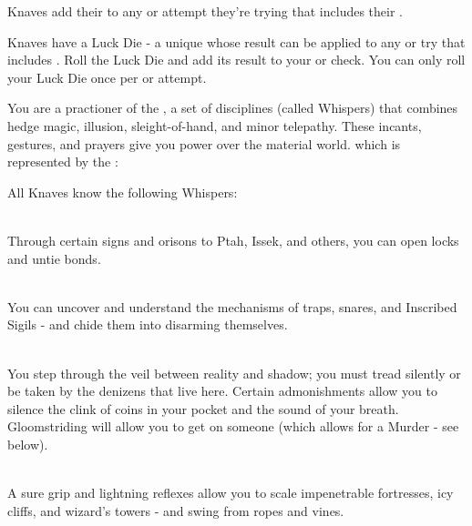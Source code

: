 {  
  Knaves add their \LVL to any \RO or \RB attempt they're trying that includes their \DEX.  

  Knaves have a Luck Die - a unique \UD whose result can be applied to any \RO or \RB try that includes \DEX.  Roll the Luck Die and add its result to your \RO or \RB check.  You can only roll your Luck Die once per \RO or \RB attempt.


  You are a practioner of the , a set of disciplines (called Whispers) that combines hedge magic, illusion, sleight-of-hand, and minor telepathy.  These incants, gestures, and prayers give you power over the material world.  which is represented by the \KNAVE:


  All Knaves know the following Whispers:

   \\
  Through certain signs and orisons to Ptah, Issek, and others, you can open locks and untie bonds.

   \\
  You can uncover and understand the mechanisms of traps, snares, and Inscribed Sigils - and chide them into disarming themselves.

   \\
  You step through the veil between reality and shadow; you must tread silently or be taken by the denizens that live here.  Certain admonishments allow you to silence the clink of coins in your pocket and the sound of your breath.  Gloomstriding will allow you to get  on someone (which allows for a Murder - see below).

   \\
  A sure grip and lightning reflexes allow you to scale impenetrable fortresses, icy cliffs, and wizard's towers - and swing from ropes and vines.

}
